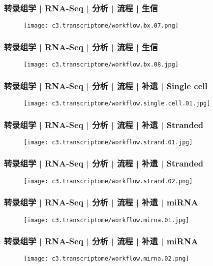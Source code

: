 \begin{frame}
  \frametitle{转录组学 | RNA-Seq | 分析 | 流程 | 生信}
  \begin{figure}
    \centering
    \texttt{[image: c3.transcriptome/workflow.bx.07.png]}
  \end{figure}
\end{frame}

\begin{frame}
  \frametitle{转录组学 | RNA-Seq | 分析 | 流程 | 生信}
  \begin{figure}
    \centering
    \texttt{[image: c3.transcriptome/workflow.bx.08.jpg]}
  \end{figure}
\end{frame}

\begin{frame}
  \frametitle{转录组学 | RNA-Seq | 分析 | 流程 | 补遗 | Single cell}
  \begin{figure}
    \centering
    \texttt{[image: c3.transcriptome/workflow.single.cell.01.jpg]}
  \end{figure}
\end{frame}

\begin{frame}
  \frametitle{转录组学 | RNA-Seq | 分析 | 流程 | 补遗 | Stranded}
  \begin{figure}
    \centering
    \texttt{[image: c3.transcriptome/workflow.strand.01.jpg]}
  \end{figure}
\end{frame}

\begin{frame}
  \frametitle{转录组学 | RNA-Seq | 分析 | 流程 | 补遗 | Stranded}
  \begin{figure}
    \centering
    \texttt{[image: c3.transcriptome/workflow.strand.02.png]}
  \end{figure}
\end{frame}

\begin{frame}
  \frametitle{转录组学 | RNA-Seq | 分析 | 流程 | 补遗 | miRNA}
  \begin{figure}
    \centering
    \texttt{[image: c3.transcriptome/workflow.mirna.01.jpg]}
  \end{figure}
\end{frame}

\begin{frame}
  \frametitle{转录组学 | RNA-Seq | 分析 | 流程 | 补遗 | miRNA}
  \begin{figure}
    \centering
    \texttt{[image: c3.transcriptome/workflow.mirna.02.png]}
  \end{figure}
\end{frame}

